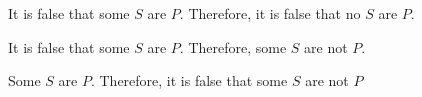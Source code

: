 \begin{exercises}
\item It is false that some $S$ are $P$. Therefore, it is false that no $S$ are $P$. 	

\item It is false that some $S$ are $P$. Therefore, some $S$ are not $P$.		

\item Some $S$ are $P$. Therefore, it is false that some $S$ are not $P$  



\end{exercises}

